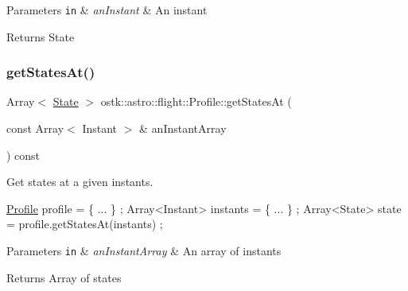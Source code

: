 \begin{DoxyParams}[1]{Parameters}
\mbox{\tt in}  & {\em an\+Instant} & An instant \\
\hline
\end{DoxyParams}
\begin{DoxyReturn}{Returns}
State 
\end{DoxyReturn}
\mbox{\label{classostk_1_1astro_1_1flight_1_1_profile_af35830c9e26ca7fffcc6e7e3ce86e9b2}} 
\subsubsection{\texorpdfstring{get\+States\+At()}{getStatesAt()}}
{\footnotesize\ttfamily Array$<$ \hyperlink{classostk_1_1astro_1_1flight_1_1profile_1_1_state}{State} $>$ ostk\+::astro\+::flight\+::\+Profile\+::get\+States\+At (\begin{DoxyParamCaption}\item[{const Array$<$ Instant $>$ \&}]{an\+Instant\+Array }\end{DoxyParamCaption}) const}



Get states at a given instants. 


\begin{DoxyCode}
\hyperlink{classostk_1_1astro_1_1flight_1_1_profile_a09d523b4a58db0d8cc082b4a4d1418a7}{Profile} profile = \{ ... \} ;
Array<Instant> instants = \{ ... \} ;
Array<State> state = profile.getStatesAt(instants) ;
\end{DoxyCode}



\begin{DoxyParams}[1]{Parameters}
\mbox{\tt in}  & {\em an\+Instant\+Array} & An array of instants \\
\hline
\end{DoxyParams}
\begin{DoxyReturn}{Returns}
Array of states 
\end{DoxyReturn}
\mbox{\label{classostk_1_1astro_1_1flight_1_1_profile_a17e61fe4527fb08c012c56a01fa23292}} 
